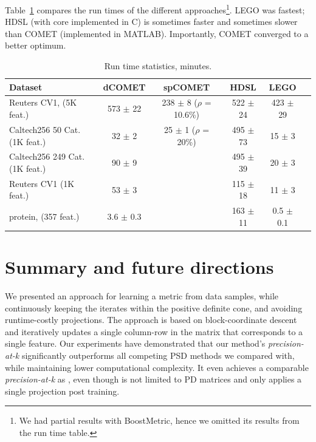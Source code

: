 \documentclass[twoside,11pt]{article}
\newcommand{\tabref}[1]{Table~\ref{#1}}
\begin{document}
\tabref{runtimes} compares the run times of the different approaches\footnote{We had partial results with BoostMetric, hence we omitted its results from the run time table.}. LEGO was fastest; HDSL (with core implemented in C) is sometimes faster and sometimes slower than COMET (implemented in MATLAB). Importantly, COMET converged to a better optimum.

\begin{table}[t]
\caption{Run time statistics, minutes.}
\label{runtimes}
\vskip 0.15in
\begin{center}
\begin{small}
\begin{sc}
\begin{tabular}{lccccr}
\hline
Dataset     & dCOMET           & spCOMET            & HDSL             & LEGO            \\ 
\hline
Reuters CV1, (5K feat.)&  573 $\pm$    22 &   238 $\pm$    8 ($\rho$ = 10.6\%) &522 $\pm$    24 &   423 $\pm$    29 & \\ 
Caltech256 50 Cat. (1K feat.)  &    32 $\pm$     2 &        25 $\pm$  1 ($\rho$ = 20\%)     &   495 $\pm$    73 &     15 $\pm$     3 &\\ 
Caltech256 249 Cat. (1K feat.) &   90 $\pm$     9 &                  &  495 $\pm$    39  &     20 $\pm$     3 &\\
Reuters CV1 (1K feat.) &   53 $\pm$     3 &                  &   115 $\pm$    18 &     11 $\pm$     3 &\\ 
protein, (357 feat.)  &    3.6 $\pm$     0.3 &                  &   163 $\pm$    11 &      0.5 $\pm$     0.1 &\\ 
\hline
\end{tabular}
\end{sc}
\end{small}
\end{center}
\vskip -0.1in
\end{table}

\section{Summary and future directions}
We presented an approach for learning a metric from data samples, while continuously keeping the iterates within the positive definite cone, and avoiding runtime-costly projections. The approach is based on block-coordinate descent and iteratively updates a single column-row in the matrix that corresponds to a single feature. Our experiments have demonstrated that our method's \textit{precision-at-k} significantly outperforms all competing PSD methods we compared with, while maintaining lower computational complexity. It even achieves a comparable \textit{precision-at-k} as \citep{OASIS}, even though \citep{OASIS} is not limited to PD matrices and only applies a single projection post training.
\end{document}
